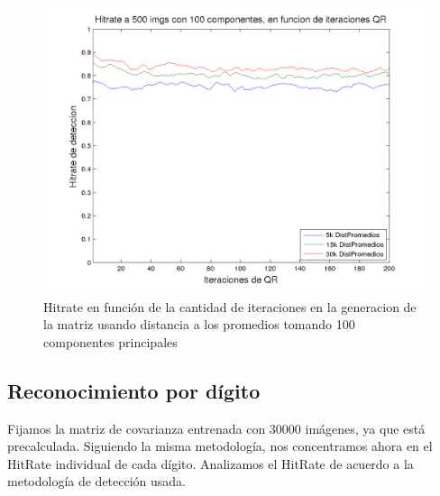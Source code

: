 \begin{figure}[H]
\begin {center}
\includegraphics[width=\hrwidth]{plots/HR_100_1.png}
\end {center}
\caption{Hitrate en funci\'on de la cantidad de iteraciones en la generacion de la matriz
usando distancia a los promedios tomando 100 componentes principales}
\label{fig:HR100Avg}
\end{figure}








\subsection{Reconocimiento por d\'igito}
Fijamos la matriz de covarianza entrenada con 30000 im\'agenes, ya que est\'a precalculada.
Siguiendo la misma metodolog\'ia, nos concentramos ahora en el HitRate individual
de cada d\'igito. Analizamos el HitRate de acuerdo a la metodolog\'ia de detecci\'on usada.

\def \pdwidth {500pt}

